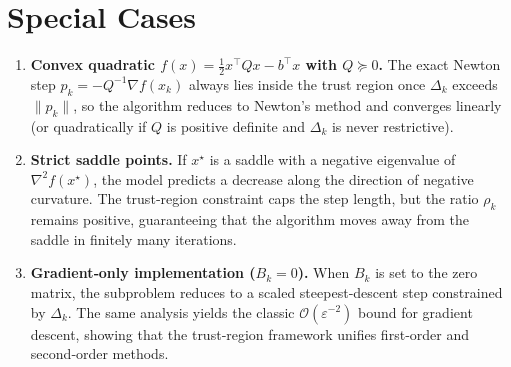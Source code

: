 \documentclass{article}
\begin{document}
\section*{Special Cases}
\begin{enumerate}[label=(\alph*)]
\item \textbf{Convex quadratic $f(x)=\frac12x^{\top}Qx-b^{\top}x$ with $Q\succeq 0$.}  
The exact Newton step $p_k=-Q^{-1}\nabla f(x_k)$ always lies inside the trust region once $\Delta_k$ exceeds $\|p_k\|$, so the algorithm reduces to Newton’s method and converges linearly (or quadratically if $Q$ is positive definite and $\Delta_k$ is never restrictive).

\item \textbf{Strict saddle points.}  
If $x^{\star}$ is a saddle with a negative eigenvalue of $\nabla^{2}f(x^{\star})$, the model predicts a decrease along the direction of negative curvature. The trust‑region constraint caps the step length, but the ratio $\rho_k$ remains positive, guaranteeing that the algorithm moves away from the saddle in finitely many iterations.

\item \textbf{Gradient‑only implementation ($B_k=0$).}  
When $B_k$ is set to the zero matrix, the subproblem reduces to a scaled steepest‑descent step constrained by $\Delta_k$. The same analysis yields the classic $\mathcal{O}(\varepsilon^{-2})$ bound for gradient descent, showing that the trust‑region framework unifies first‑order and second‑order methods.
\end{enumerate}
\end{document}
